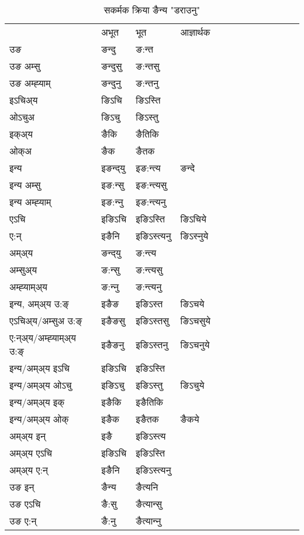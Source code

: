 \begin{table}[H]
\centering
\caption{\label{int.vt} सकर्मक क्रिया  ङैन्य  "डराउनु"  }
\begin{tabular}{l|l|l|l|l|l|l|l|l|l|l|l|l}  \toprule
&अभूत & भूत & आज्ञार्थक \\ 
उङ &ङन्दु &ङ:न्त \\ 
उङ अम्सु&ङन्दुसु &ङ:न्तसु \\ 
उङ अम्ह्‍याम्&ङन्दुनु &ङ:न्तनु \\ 
इऽचिअ्य &ङिऽचि &ङिऽस्ति   \\ 
ओऽचुअ        &ङिऽचु &ङिऽस्तु   \\ 
इक्अ्य&ङैकि &ङैतिकि   \\ 
ओक्अ &ङैक &ङैतक   \\ 
इन्य & इङन्द्‌यु  & इङ:न्त्य &ङन्दे  \\ 
इन्य अम्सु& इङ:न्सु  & इङ:न्त्यसु   \\ 
इन्य अम्ह्‍याम्& इङ:न्‍नु  & इङ:न्त्यनु   \\ 
एऽचि & इङिऽचि & इङिऽस्ति &ङिऽचिये    \\ 
ए:न् & इङैनि  & इङिऽस्त्यनु &ङिऽस्‍नुये  \\ 
अम्अ्य & ङन्द्‌यु  & ङ:न्त्य  \\ 
अम्सुअ्य & ङ:न्सु & ङ:न्त्यसु  \\ 
अम्ह्‍याम्अ्य & ङ:न्‍नु  & ङ:न्त्यनु \\ 
\midrule
इन्य, अम्अ्य उ:ङ्‌ &इङैङ &इङिऽस्त &ङिऽचये \\ 
एऽचिअ्य/अम्सुअ उ:ङ्‌ &इङैङसु &इङिऽस्तसु &ङिऽचसुये \\ 
ए:न्अ्य/अम्ह्‍याम्अ्य उ:ङ्‌ &इङैङनु &इङिऽस्तनु &ङिऽचनुये \\ 
इन्य/अम्अ्य इऽचि &इङिऽचि &इङिऽस्ति    \\ 
इन्य/अम्अ्य ओऽचु &इङिऽचु &इङिऽस्तु  &ङिऽचुये  \\ 
इन्य/अम्अ्य इक् &इङैकि &इङैतिकि   \\ 
इन्य/अम्अ्य ओक् &इङैक &इङैतक  &ङैकये  \\ 
अम्अ्य इन् & इङै & इङिऽस्त्य   \\ 
अम्अ्य एऽचि & इङिऽचि & इङिऽस्ति    \\ 
अम्अ्य ए:न् & इङैनि  & इङिऽस्त्यनु  \\ 
\midrule
उङ इन् & ङैन्य  & ङैत्यनि  \\ 
उङ एऽचि & ङै:सु  & ङैत्यान्सु   \\ 
उङ ए:न्& ङै:नु  & ङैत्यान्‍नु   \\ 
\bottomrule
\end{tabular}
\end{table}



